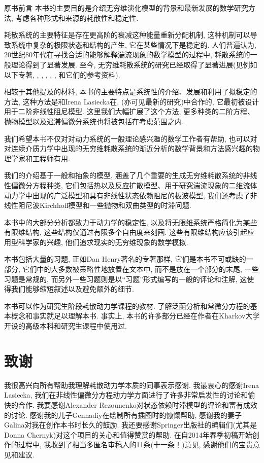 \begin{PreChapter}{原书前言}
	本书的主要目的是介绍无穷维演化模型的背景和最新发展的数学研究方法, 考虑各种形式和来源的耗散性和稳定性. 
	
	耗散系统的主要特征是存在更高阶的衰减这种能量重新分配机制, 这种机制可以导致系统中复杂的极限状态和结构的产生, 它在某些情况下是稳定的. 人们普遍认为, 20世纪80年代在寻找合适的能够解释湍流现象的数学模型的过程中, 耗散系统的一般理论得到了显著发展. 至今, 无穷维耗散系统的研究已经取得了显著进展(见例如以下专著\cite{Babin92}, \cite{Chepyzhov02}, \cite{Hale88}, \cite{Ladyzhenskaya91}, \cite{Robinson01}, \cite{Sell02}, \cite{Temam97}和它们的参考资料). 
	
	相较于其他提及的材料, 本书的主要特点是系统性的介绍、发展和利用了拟稳定的方法, 这种方法是和Irena Lasiecka在\cite{Chueshov08}, \cite{Chueshov10}(亦可见最新的研究\cite{Chueshov13})中合作的, 它最初被设计用于二阶非线性阻尼模型. 这里我们大幅扩展了这个方法, 更多种类的二阶方程、抛物模型以及迟滞偏微分系统也将被包括在考虑范围之内. 
	
	我们希望本书不仅对对动力系统的一般理论感兴趣的数学工作者有帮助, 也可以对对连续介质力学中出现的无穷维耗散系统的渐近分析的数学背景和方法感兴趣的物理学家和工程师有用. 
	
	我们的介绍基于一般和抽象的模型, 涵盖了几个重要的生成无穷维耗散系统的非线性偏微分方程种类, 它们包括热以及反应扩散模型、用于研究湍流现象的二维流体动力学中出现的广泛模型和具有非线性状态依赖阻尼的板波模型, 我们还考虑了非线性阻尼波Kirchhoff模型和一些抛物和双曲类型的时滞问题. 
	
	本书中的大部分分析都致力于动力学的稳定性, 以及将无限维系统严格简化为某些有限维结构, 这些结构仅通过有限多个自由度来刻画. 这些有限维结构应该引起应用型科学家的兴趣, 他们追求现实的无穷维现象的数学模拟. 
	
	本书包括大量的习题, 正如Dan Henry著名的专著\cite{Henry81}那样, 它们是本书不可或缺的一部分, 它们中的大多数被策略性地放置在文本中, 而不是放在一个部分的末尾, 一些习题是常规的, 而另外一些习题则是以“习题”形式编写的一般的评论和注解, 这使得我们能够缩短叙述以及避免额外的细节. 
	
	本书可以作为研究生阶段耗散动力学课程的教材. 了解泛函分析和常微分方程的基本概念和事实就足以理解本书.  事实上, 本书的许多部分已经在作者在Kharkov大学开设的高级本科和研究生课程中使用过. 

	\section*{致谢}

	我很高兴向所有帮助我理解耗散动力学本质的同事表示感谢. 我最衷心的感谢Irena Lasiecka, 我们在非线性偏微分方程动力学方面进行了许多非常启发性的讨论和愉快的合作. 我要感谢Alexander Rezounenko对状态依赖时滞模型的评论和富有成效的讨论. 感谢我的儿子Gennadiy在绘制所有插图时的慷慨帮助, 感谢我的妻子Galina对我在创作本书时长久的鼓励. 我还要感谢Springer出版社的编辑们(尤其是Donna Chernyk)对这个项目的关心和值得赞赏的帮助. 在自2014年春季初稿开始创作的过程中, 我收到了相当多匿名审稿人的11条(十一条！)意见, 感谢他们的宝贵意见和建议. 
		

\end{PreChapter}
